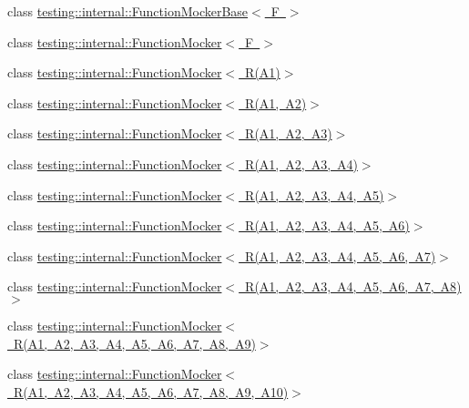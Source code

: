 \begin{DoxyCompactItemize}
\item 
class \mbox{\hyperlink{classtesting_1_1internal_1_1FunctionMockerBase}{testing\+::internal\+::\+Function\+Mocker\+Base$<$ F $>$}}
\item 
class \mbox{\hyperlink{classtesting_1_1internal_1_1FunctionMocker}{testing\+::internal\+::\+Function\+Mocker$<$ F $>$}}
\item 
class \mbox{\hyperlink{classtesting_1_1internal_1_1FunctionMocker_3_01R_07A1_08_4}{testing\+::internal\+::\+Function\+Mocker$<$ R(\+A1)$>$}}
\item 
class \mbox{\hyperlink{classtesting_1_1internal_1_1FunctionMocker_3_01R_07A1_00_01A2_08_4}{testing\+::internal\+::\+Function\+Mocker$<$ R(\+A1, A2)$>$}}
\item 
class \mbox{\hyperlink{classtesting_1_1internal_1_1FunctionMocker_3_01R_07A1_00_01A2_00_01A3_08_4}{testing\+::internal\+::\+Function\+Mocker$<$ R(\+A1, A2, A3)$>$}}
\item 
class \mbox{\hyperlink{classtesting_1_1internal_1_1FunctionMocker_3_01R_07A1_00_01A2_00_01A3_00_01A4_08_4}{testing\+::internal\+::\+Function\+Mocker$<$ R(\+A1, A2, A3, A4)$>$}}
\item 
class \mbox{\hyperlink{classtesting_1_1internal_1_1FunctionMocker_3_01R_07A1_00_01A2_00_01A3_00_01A4_00_01A5_08_4}{testing\+::internal\+::\+Function\+Mocker$<$ R(\+A1, A2, A3, A4, A5)$>$}}
\item 
class \mbox{\hyperlink{classtesting_1_1internal_1_1FunctionMocker_3_01R_07A1_00_01A2_00_01A3_00_01A4_00_01A5_00_01A6_08_4}{testing\+::internal\+::\+Function\+Mocker$<$ R(\+A1, A2, A3, A4, A5, A6)$>$}}
\item 
class \mbox{\hyperlink{classtesting_1_1internal_1_1FunctionMocker_3_01R_07A1_00_01A2_00_01A3_00_01A4_00_01A5_00_01A6_00_01A7_08_4}{testing\+::internal\+::\+Function\+Mocker$<$ R(\+A1, A2, A3, A4, A5, A6, A7)$>$}}
\item 
class \mbox{\hyperlink{classtesting_1_1internal_1_1FunctionMocker_3_01R_07A1_00_01A2_00_01A3_00_01A4_00_01A5_00_01A6_00_01A7_00_01A8_08_4}{testing\+::internal\+::\+Function\+Mocker$<$ R(\+A1, A2, A3, A4, A5, A6, A7, A8)$>$}}
\item 
class \mbox{\hyperlink{classtesting_1_1internal_1_1FunctionMocker_3_01R_07A1_00_01A2_00_01A3_00_01A4_00_01A5_00_01A6_00_01A7_00_01A8_00_01A9_08_4}{testing\+::internal\+::\+Function\+Mocker$<$ R(\+A1, A2, A3, A4, A5, A6, A7, A8, A9)$>$}}
\item 
class \mbox{\hyperlink{classtesting_1_1internal_1_1FunctionMocker_3_01R_07A1_00_01A2_00_01A3_00_01A4_00_01A5_00_01A6_0079295c90ba14a714e84d5a856a5b50dd}{testing\+::internal\+::\+Function\+Mocker$<$ R(\+A1, A2, A3, A4, A5, A6, A7, A8, A9, A10)$>$}}

\end{DoxyCompactItemize}
